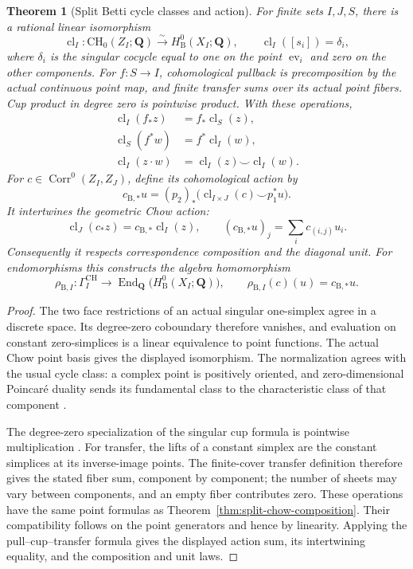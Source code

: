 \documentclass[11pt]{article}
\newtheorem{theorem}{Theorem}[section]
\theoremstyle{definition}
\theoremstyle{remark}
\DeclareMathOperator{\End}{End}
\DeclareMathOperator{\ev}{ev}
\newcommand{\Q}{\mathbf Q}
\begin{document}
\begin{theorem}[Split Betti cycle classes and action]
\label{thm:split-betti-cycle-class}
For finite sets \(I,J,S\), there is a rational linear isomorphism
\[
 \operatorname{cl}_I:\mathrm{CH}_0(Z_I;\Q)
   \xrightarrow{\sim} H^0_{\mathrm B}(X_I;\Q),
 \qquad \operatorname{cl}_I([s_i])=\delta_i,
\]
where \(\delta_i\) is the singular cocycle equal to one on the point
\(\ev_i\) and zero on the other components.
For \(f:S\to I\), cohomological pullback is precomposition by the actual
continuous point map, and finite transfer sums over its actual point
fibers.  Cup product in degree zero is pointwise product.  With these
operations,
\[
 \begin{aligned}
 \operatorname{cl}_I(f_*z)&=f_*\operatorname{cl}_S(z),\\
 \operatorname{cl}_S(f^*w)&=f^*\operatorname{cl}_I(w),\\
 \operatorname{cl}_I(z\cdot w)
   &=\operatorname{cl}_I(z)\smile\operatorname{cl}_I(w).
 \end{aligned}
\]
For \(c\in\operatorname{Corr}^0(Z_I,Z_J)\), define its cohomological
action by
\[
 c_{\mathrm B,*}u=(p_2)_*
   \bigl(\operatorname{cl}_{I\times J}(c)\smile p_1^*u\bigr).
\]
It intertwines the geometric Chow action:
\[
 \operatorname{cl}_J(c_*z)
    =c_{\mathrm B,*}\operatorname{cl}_I(z),
 \qquad
 (c_{\mathrm B,*}u)_j=\sum_i c_{(i,j)}u_i.
\]
Consequently it respects correspondence composition and the diagonal unit.
For endomorphisms this constructs the algebra homomorphism
\[
 \rho_{\mathrm B,I}:\Gamma_I^{\mathrm{CH}}
   \longrightarrow\End_{\Q}\bigl(H^0_{\mathrm B}(X_I;\Q)\bigr),
 \qquad \rho_{\mathrm B,I}(c)(u)=c_{\mathrm B,*}u.
\]
\end{theorem}

\begin{proof}
The two face restrictions of an actual singular one-simplex agree in a
discrete space.  Its degree-zero coboundary therefore vanishes, and
evaluation on constant zero-simplices is a linear equivalence to point
functions.  The actual Chow point basis gives the displayed isomorphism.
The normalization agrees with the usual cycle class: a complex point is
positively oriented, and zero-dimensional Poincar\'e duality sends its
fundamental class to the characteristic class of that component
\cite[\S1]{DeligneHodgeConjecture}.

The degree-zero specialization of the singular cup formula is pointwise
multiplication \cite[\S3.2, p.~206]{HatcherAlgebraicTopology}.
For transfer, the lifts of a constant simplex are the constant simplices
at its inverse-image points.  The finite-cover transfer definition
\cite[\S3.G, p.~321]{HatcherAlgebraicTopology} therefore gives the stated
fiber sum, component by component; the number of sheets may vary between
components, and an empty fiber contributes zero.  These operations have
the same point formulas as Theorem~\ref{thm:split-chow-composition}.
Their compatibility follows on the point generators and hence by
linearity.  Applying the pull--cup--transfer formula gives the displayed
action sum, its intertwining equality, and the composition and unit laws.
\end{proof}
\end{document}
